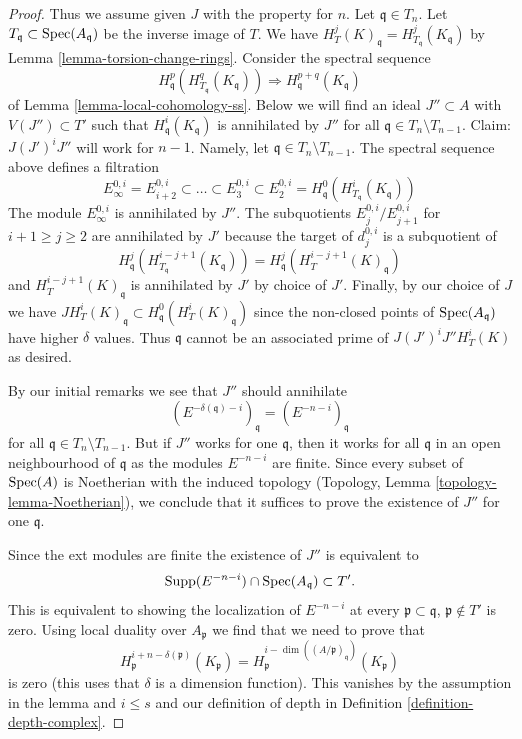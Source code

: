 \begin{proof}
\medskip\noindent
Thus we assume given $J$ with the property for $n$.
Let $\mathfrak q \in T_n$. Let $T_\mathfrak q \subset \mathop{\mathrm{Spec}}(A_\mathfrak q)$
be the inverse image of $T$. We have
$H^j_T(K)_\mathfrak q = H^j_{T_\mathfrak q}(K_\mathfrak q)$
by Lemma \ref{lemma-torsion-change-rings}.
Consider the spectral sequence
$$
H_\mathfrak q^p(H^q_{T_\mathfrak q}(K_\mathfrak q))
\Rightarrow
H^{p + q}_\mathfrak q(K_\mathfrak q)
$$
of Lemma \ref{lemma-local-cohomology-ss}.
Below we will find an ideal $J'' \subset A$ with $V(J'') \subset T'$
such that $H^i_\mathfrak q(K_\mathfrak q)$ is annihilated by $J''$ for all
$\mathfrak q \in T_n \setminus T_{n - 1}$.
Claim: $J (J')^i J''$ will work for $n - 1$.
Namely, let $\mathfrak q \in T_n \setminus T_{n - 1}$.
The spectral sequence above defines a filtration
$$
E_\infty^{0, i} = E_{i + 2}^{0, i} \subset \ldots \subset E_3^{0, i} \subset
E_2^{0, i} = H^0_\mathfrak q(H^i_{T_\mathfrak q}(K_\mathfrak q))
$$
The module $E_\infty^{0, i}$ is annihilated by $J''$.
The subquotients $E_j^{0, i}/E_{j + 1}^{0, i}$ for $i + 1 \geq j \geq 2$
are annihilated by $J'$ because the target of $d_j^{0, i}$
is a subquotient of
$$
H^j_\mathfrak q(H^{i - j + 1}_{T_\mathfrak q}(K_\mathfrak q)) =
H^j_\mathfrak q(H^{i - j + 1}_T(K)_\mathfrak q)
$$
and $H^{i - j + 1}_T(K)_\mathfrak q$ is annihilated by $J'$ by choice of $J'$.
Finally, by our choice of $J$ we have
$J H^i_T(K)_\mathfrak q \subset H^0_\mathfrak q(H^i_T(K)_\mathfrak q)$
since the non-closed points of $\mathop{\mathrm{Spec}}(A_\mathfrak q)$ have higher
$\delta$ values. Thus $\mathfrak q$ cannot be an associated prime of
$J(J')^iJ'' H^i_T(K)$ as desired.

\medskip\noindent
By our initial remarks we see that $J''$ should annihilate
$$
(E^{-\delta(\mathfrak q) - i})_\mathfrak q =
(E^{-n - i})_\mathfrak q
$$
for all $\mathfrak q \in T_n \setminus T_{n - 1}$.
But if $J''$ works for one $\mathfrak q$, then it works for all
$\mathfrak q$ in an open neighbourhood of $\mathfrak q$
as the modules $E^{-n - i}$ are finite.
Since every subset of $\mathop{\mathrm{Spec}}(A)$ is Noetherian with the induced
topology (Topology, Lemma \ref{topology-lemma-Noetherian}),
we conclude that it suffices
to prove the existence of $J''$ for one $\mathfrak q$.

\medskip\noindent
Since the ext modules are finite the existence of $J''$ is
equivalent to
$$
\text{Supp}(E^{-n - i}) \cap \mathop{\mathrm{Spec}}(A_\mathfrak q) \subset T'.
$$
This is equivalent to showing the localization of $E^{-n - i}$ at every
$\mathfrak p \subset \mathfrak q$, $\mathfrak p \not \in T'$
is zero. Using local duality over $A_\mathfrak p$ we find that we need
to prove that
$$
H^{i + n - \delta(\mathfrak p)}_\mathfrak p(K_\mathfrak p) =
H^{i - \dim((A/\mathfrak p)_\mathfrak q)}_\mathfrak p(K_\mathfrak p)
$$
is zero (this uses that $\delta$ is a dimension function).
This vanishes by the assumption in the lemma and $i \leq s$ and
our definition of depth in Definition \ref{definition-depth-complex}.


\end{proof}
